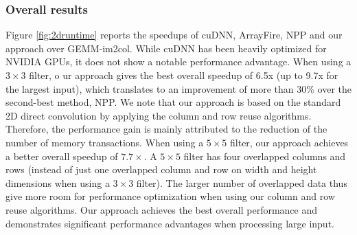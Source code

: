 \subsubsection{Overall results}
 Figure
\ref{fig:2druntime} reports the speedups of cuDNN, ArrayFire, NPP and our approach over GEMM-im2col. While cuDNN has been heavily optimized
for NVIDIA GPUs, it does not show a notable performance advantage. When using a $3 \times 3$ filter, o ur approach gives the best overall
speedup of 6.5x (up to 9.7x for the largest input), which translates to an improvement of  more than 30\% over the second-best method, NPP.
We note that our approach is based on the standard 2D direct convolution by applying the column and row reuse algorithms. Therefore, the
performance gain is mainly attributed to the reduction of the number of memory transactions. When using a $5 \times 5$ filter, our approach
achieves a better overall speedup of $7.7\times$. A $5 \times 5$ filter has four overlapped columns and rows (instead of just one
overlapped column and row on width and height dimensions when using a $3 \times 3$ filter). The larger number of overlapped data thus give
more room for performance optimization when using our column and row reuse algorithms. Our approach achieves the best overall performance
and demonstrates significant performance advantages when processing large input.

